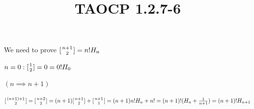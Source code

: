 \documentclass{article}
\title{TAOCP 1.2.7\mbox{-}6}
\begin{document}
\maketitle

We need to prove \( [{n + 1 \atop 2}] = n! H_{n} \)

\( n = 0: [{1 \atop 2}] = 0 = 0! H_{0} \)

\( (n \implies n + 1) \)

\( [{(n + 1)+1 \atop 2}] = [{n + 2 \atop 2}] = (n + 1) [{n + 1 \atop 2}] + [{n + 1 \atop 1}] = (n+1)n!H_{n} + n! = (n+1)!(H_{n} + \frac{1}{n+1})=(n+1)!H_{n+1} \)
\end{document}
